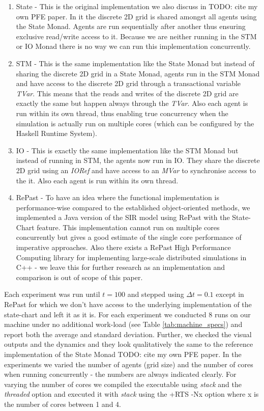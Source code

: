\begin{enumerate}
	\item State - This is the original implementation we also discuss in TODO: cite my own PFE paper. In it the discrete 2D grid is shared amongst all agents using the State Monad. Agents are run sequentially after another thus ensuring exclusive read/write access to it. Because we are neither running in the STM or IO Monad there is no way we can run this implementation concurrently.
	\item STM - This is the same implementation like the State Monad but instead of sharing the discrete 2D grid in a State Monad, agents run in the STM Monad and have access to the discrete 2D grid through a transactional variable \textit{TVar}. This means that the reads and writes of the discrete 2D grid are exactly the same but happen always through the \textit{TVar}. Also each agent is run within its own thread, thus enabling true concurrency when the simulation is actually run on multiple cores (which can be configured by the Haskell Runtime System).
	\item IO - This is exactly the same implementation like the STM Monad but instead of running in STM, the agents now run in IO. They share the discrete 2D grid using an \textit{IORef} and have access to an \textit{MVar} to synchronise access to the it. Also each agent is run within its own thread.
	\item RePast - To have an idea where the functional implementation is performance-wise compared to the established object-oriented methods, we implemented a Java version of the SIR model using RePast with the State-Chart feature. This implementation cannot run on multiple cores concurrently but gives a good estimate of the single core performance of imperative approaches. Also there exists a RePast High Performance Computing library for implementing large-scale distributed simulations in C++ - we leave this for further research as an implementation and comparison is out of scope of this paper.
\end{enumerate}

Each experiment was run until $t = 100$ and stepped using $\Delta t = 0.1$ except in RePast for which we don't have access to the underlying implementation of the state-chart and left it as it is. For each experiment we conducted 8 runs on our machine under no additional work-load (see Table \ref{tab:machine_specs}) and report both the average and standard deviation. Further, we checked the visual outputs and the dynamics and they look qualitatively the same to the reference implementation of the State Monad TODO: cite my own PFE paper. In the experiments we varied the number of agents (grid size) and the number of cores when running concurrently - the numbers are always indicated clearly. For varying the number of cores we compiled the executable using \textit{stack} and the \textit{threaded} option and executed it with \textit{stack} using the +RTS -Nx option where x is the number of cores between 1 and 4. 

